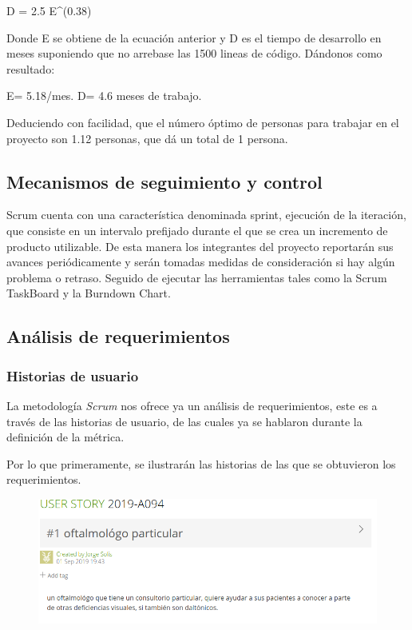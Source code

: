 \documentclass[10pt]{article}
\begin{document}
\begin{equiation}
D = 2.5 E^(0.38)
\end{equiation}

Donde E se obtiene de la ecuación anterior y D es el tiempo de desarrollo en meses suponiendo que no arrebase las 1500 lineas de código.
Dándonos como resultado:

E= 5.18/mes.
D= 4.6 meses de trabajo.

Deduciendo con facilidad, que el número óptimo de personas para trabajar en el proyecto son 1.12 personas, que dá un total de 1 persona.

\subsection{Mecanismos de seguimiento y control}

Scrum cuenta con una característica denominada sprint, ejecución de la iteración, que consiste en un intervalo prefijado durante el que se crea un incremento de producto utilizable. De esta manera los integrantes del proyecto reportarán sus avances periódicamente y serán tomadas medidas de consideración si hay algún problema o retraso. Seguido de ejecutar las herramientas tales como la Scrum TaskBoard y la Burndown Chart.


\subsection{Análisis de requerimientos}
\subsubsection{Historias de usuario}
La metodología \textit{Scrum} nos ofrece ya un análisis de requerimientos, este es a través de las historias de usuario, de las cuales ya se hablaron durante la definición de la métrica.

Por lo que primeramente, se ilustrarán las historias de las que se obtuvieron los requerimientos.

\begin{figure}[H]
	\begin{center}
\includegraphics[scale = .55]{HS/US1.png}
	\end{center} 
\end{figure}
\end{document}
